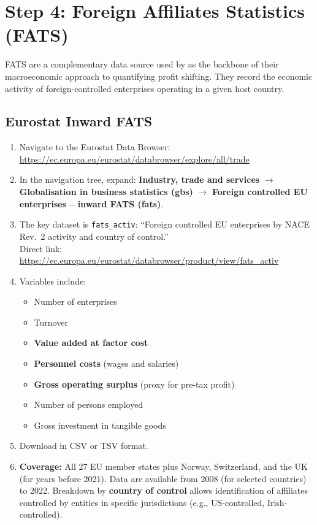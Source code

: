 \documentclass[12pt,a4paper]{article}
\begin{document}
\section{Step 4: Foreign Affiliates Statistics (FATS)}\label{sec:fats}

FATS are a complementary data source used by \textcite{torslov2022} as the backbone of their macroeconomic approach to quantifying profit shifting.
They record the economic activity of foreign-controlled enterprises operating in a given host country.

\subsection{Eurostat Inward FATS}

\begin{enumerate}
\item Navigate to the Eurostat Data Browser:\\
\url{https://ec.europa.eu/eurostat/databrowser/explore/all/trade}
\item In the navigation tree, expand: \textbf{Industry, trade and services} $\rightarrow$ \textbf{Globalisation in business statistics (gbs)} $\rightarrow$ \textbf{Foreign controlled EU enterprises -- inward FATS (fats)}.
\item The key dataset is \texttt{fats\_activ}: ``Foreign controlled EU enterprises by NACE Rev.~2 activity and country of control.''\\
Direct link: \url{https://ec.europa.eu/eurostat/databrowser/product/view/fats_activ}
\item Variables include:
\begin{itemize}
    \item Number of enterprises
    \item Turnover
    \item \textbf{Value added at factor cost}
    \item \textbf{Personnel costs} (wages and salaries)
    \item \textbf{Gross operating surplus} (proxy for pre-tax profit)
    \item Number of persons employed
    \item Gross investment in tangible goods
\end{itemize}
\item Download in CSV or TSV format.
\item \textbf{Coverage:} All 27 EU member states plus Norway, Switzerland, and the UK (for years before 2021).
Data are available from 2008 (for selected countries) to 2022.
Breakdown by \textbf{country of control} allows identification of affiliates controlled by entities in specific jurisdictions (e.g., US-controlled, Irish-controlled).
\end{enumerate}
\end{document}
